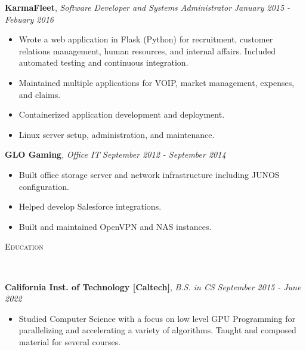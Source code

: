 \documentclass[9pt]{article}
\newenvironment{changemargin}[2]{%
  \begin{list}{}{%
    \setlength{\topsep}{0pt}%
    \setlength{\leftmargin}{#1}%
    \setlength{\rightmargin}{#2}%
    \setlength{\listparindent}{\parindent}%
    \setlength{\itemindent}{\parindent}%
    \setlength{\parsep}{\parskip}%
  }%
  \item[]}{\end{list}
}
\newcommand{\lineover}{
	\begin{changemargin}{-0.05in}{-0.05in}
		\vspace*{-8pt}
		\hrulefill \\
		\vspace*{-2pt}
	\end{changemargin}
}
\newcommand{\header}[1]{
	\begin{changemargin}{-0.5in}{-0.5in}
		\scshape{#1}\\
  	\lineover
	\end{changemargin}
}
\newenvironment{body} {
	\vspace*{-16pt}
	\begin{changemargin}{-0.25in}{-0.5in}
  }	
	{\end{changemargin}
}
\begin{document}
\begin{body}
	\textbf{KarmaFleet}, \emph{Software Developer and Systems Administrator} \hfill \emph{January 2015 - Febuary 2016}\\
	\vspace*{-3pt}
	\begin{itemize} \itemsep -0pt %
		\item Wrote a web application in Flask (Python) for recruitment, customer relations management, human resources, and internal affairs. Included automated testing and continuous integration.
		\item Maintained multiple applications for VOIP, market management, expenses, and claims.
		\item Containerized application development and deployment.
		\item Linux server setup, administration, and maintenance.
	\end{itemize}
	\vspace*{-2pt}

	\textbf{GLO Gaming}, \emph{Office IT} \hfill \emph{September 2012 - September 2014}\\
	\vspace*{-3pt}
	\begin{itemize} \itemsep -0pt %
		\item Built office storage server and network infrastructure including JUNOS configuration.
		\item Helped develop Salesforce integrations.
		\item Built and maintained OpenVPN and NAS instances.
	\end{itemize}
	\vspace*{-2pt}

	\smallskip
	\vspace*{-3pt}
	\vspace*{-5pt}
	\smallskip
\end{body}
	\header{Education}
	\begin{body}
		\vspace{16pt}
		\textbf{California Inst. of Technology [Caltech]}{}, \emph{B.S. in CS} \hfill \emph{September 2015 - June 2022}{} \\
		\vspace{-3pt}
		\begin{itemize} \itemsep -0pt
			\item Studied Computer Science with a focus on low level GPU Programming for
			parallelizing and accelerating a variety of algorithms. Taught and composed material for
			several courses.
		\end{itemize}
	\end{body}
\end{document}
